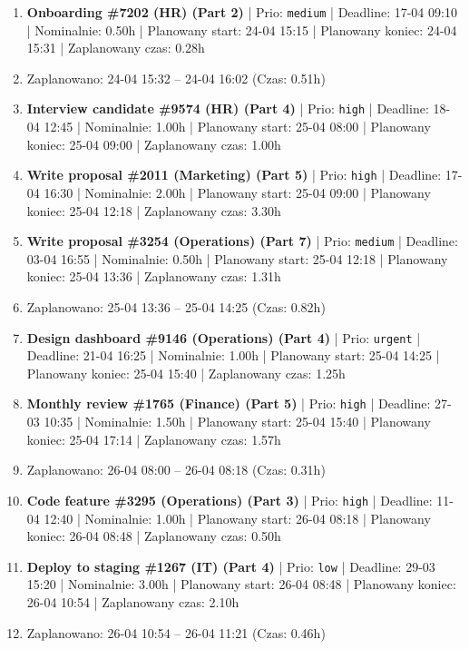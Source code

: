 {\begin{enumerate}
  \item [\textbf{14648}] \textbf{Onboarding \#7202 (HR) (Part 2)} | Prio: \texttt{medium} | Deadline: 17-04 09:10 | Nominalnie: 0.50h | Planowany start: 24-04 15:15 | Planowany koniec: 24-04 15:31 | Zaplanowany czas: 0.28h
  \item [\textbf{PRZERWA}] Zaplanowano: 24-04 15:32 -- 24-04 16:02 (Czas: 0.51h)
  \item [\textbf{14612}] \textbf{Interview candidate \#9574 (HR) (Part 4)} | Prio: \texttt{high} | Deadline: 18-04 12:45 | Nominalnie: 1.00h | Planowany start: 25-04 08:00 | Planowany koniec: 25-04 09:00 | Zaplanowany czas: 1.00h
  \item [\textbf{14628}] \textbf{Write proposal \#2011 (Marketing) (Part 5)} | Prio: \texttt{high} | Deadline: 17-04 16:30 | Nominalnie: 2.00h | Planowany start: 25-04 09:00 | Planowany koniec: 25-04 12:18 | Zaplanowany czas: 3.30h
  \item [\textbf{14663}] \textbf{Write proposal \#3254 (Operations) (Part 7)} | Prio: \texttt{medium} | Deadline: 03-04 16:55 | Nominalnie: 0.50h | Planowany start: 25-04 12:18 | Planowany koniec: 25-04 13:36 | Zaplanowany czas: 1.31h
  \item [\textbf{PRZERWA}] Zaplanowano: 25-04 13:36 -- 25-04 14:25 (Czas: 0.82h)
  \item [\textbf{14606}] \textbf{Design dashboard \#9146 (Operations) (Part 4)} | Prio: \texttt{urgent} | Deadline: 21-04 16:25 | Nominalnie: 1.00h | Planowany start: 25-04 14:25 | Planowany koniec: 25-04 15:40 | Zaplanowany czas: 1.25h
  \item [\textbf{14627}] \textbf{Monthly review \#1765 (Finance) (Part 5)} | Prio: \texttt{high} | Deadline: 27-03 10:35 | Nominalnie: 1.50h | Planowany start: 25-04 15:40 | Planowany koniec: 25-04 17:14 | Zaplanowany czas: 1.57h
  \item [\textbf{PRZERWA}] Zaplanowano: 26-04 08:00 -- 26-04 08:18 (Czas: 0.31h)
  \item [\textbf{14608}] \textbf{Code feature \#3295 (Operations) (Part 3)} | Prio: \texttt{high} | Deadline: 11-04 12:40 | Nominalnie: 1.00h | Planowany start: 26-04 08:18 | Planowany koniec: 26-04 08:48 | Zaplanowany czas: 0.50h
  \item [\textbf{14686}] \textbf{Deploy to staging \#1267 (IT) (Part 4)} | Prio: \texttt{low} | Deadline: 29-03 15:20 | Nominalnie: 3.00h | Planowany start: 26-04 08:48 | Planowany koniec: 26-04 10:54 | Zaplanowany czas: 2.10h
  \item [\textbf{PRZERWA}] Zaplanowano: 26-04 10:54 -- 26-04 11:21 (Czas: 0.46h)

\end{enumerate}}
